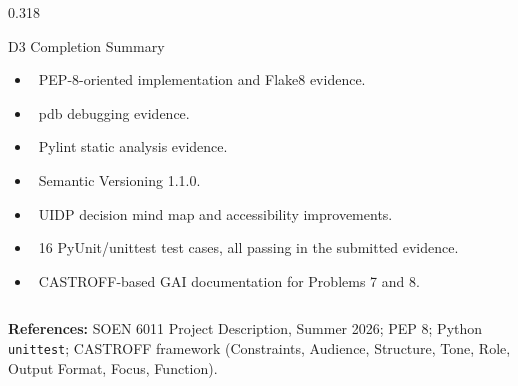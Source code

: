 \documentclass[final]{beamer}
\newcommand{\tick}{\textcolor{Green}{\bfseries\checkmark}}
\newcommand{\tightitem}{\setlength{\itemsep}{0.18em}\setlength{\parskip}{0pt}\setlength{\parsep}{0pt}}
\begin{document}
\begin{frame}[t]
\begin{columns}[t,totalwidth=\textwidth]
\begin{column}{0.318\textwidth}
\begin{block}{D3 Completion Summary}
\small
\begin{itemize}\tightitem
\item \tick\ PEP-8-oriented implementation and Flake8 evidence.
\item \tick\ pdb debugging evidence.
\item \tick\ Pylint static analysis evidence.
\item \tick\ Semantic Versioning 1.1.0.
\item \tick\ UIDP decision mind map and accessibility improvements.
\item \tick\ 16 PyUnit/unittest test cases, all passing in the submitted evidence.
\item \tick\ CASTROFF-based GAI documentation for Problems 7 and 8.
\end{itemize}
\end{block}

\end{column}
\end{columns}

\vfill
\begin{center}
\scriptsize
\textbf{References:} SOEN 6011 Project Description, Summer 2026; PEP 8; Python \texttt{unittest}; CASTROFF framework (Constraints, Audience, Structure, Tone, Role, Output Format, Focus, Function).
\end{center}

\end{frame}
\end{document}
